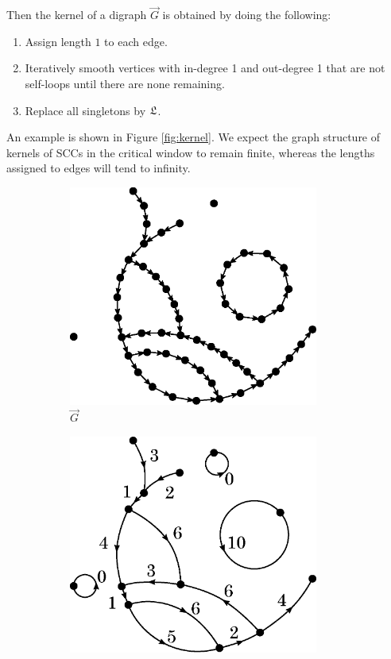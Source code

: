 Then the kernel of a digraph $\vec{G}$ is obtained by doing the following:
\begin{enumerate}
    \item Assign length $1$ to each edge.
    \item Iteratively smooth vertices with in-degree 1 and out-degree 1 that are not self-loops until there are none remaining.
    \item Replace all singletons by $\mathfrak L$.
\end{enumerate}
An example is shown in Figure \ref{fig:kernel}. We expect the graph structure of kernels of SCCs in the critical window to remain finite, whereas the lengths assigned to edges will tend to infinity.
\begin{figure}[htbp]
    \centering
    \begin{subfigure}[htbp]{0.45\textwidth}
        \centering
        \includegraphics[width=0.90\textwidth]{Content/Pictures/Fig5a.eps}
        \caption{$\vec{G}$}
    \end{subfigure}
    \hfill
    \begin{subfigure}[htbp]{0.45\textwidth}
        \centering
        \includegraphics[width=0.90\textwidth]{Content/Pictures/Fig5b.eps}

\end{subfigure}
\end{figure}
